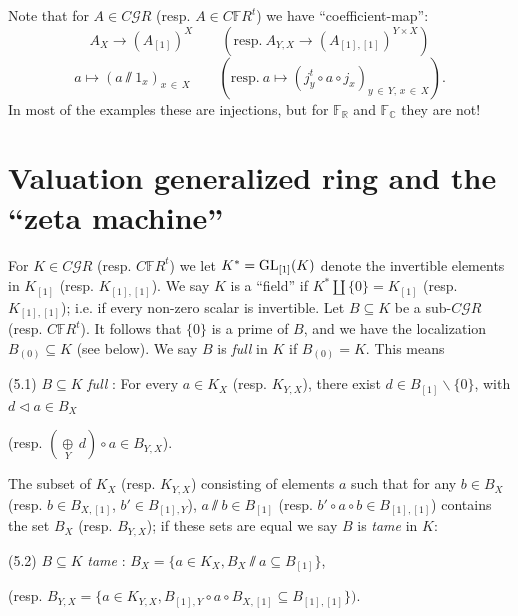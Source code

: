 \documentclass[leqno]{article}
\numberwithin{equation}{section}
\begin{document}
\smallskip

Note that for $A \in C{\mathcal G} R$ (resp. $A \in C{\mathbb F} R^t$) we have ``coefficient-map'':
$$
A_X \to (A_{[1]})^X \qquad (\mbox{resp.} \ A_{Y,X} \to (A_{[1],[1]})^{Y \times X})
$$
$$
a \mapsto (a \sslash 1_x)_{x \, \in \, X} \qquad (\mbox{resp.} \ a \mapsto (j_y^t \circ a \circ j_x)_{y \, \in \, Y , \, x \, \in \, X}).
$$
In most of the examples these are injections, but for ${\mathbb F}_{\mathbb R}$ and ${\mathbb F}_{\mathbb C}$ they are not!


\section{Valuation generalized ring and the ``zeta machine''}

For $K \in C{\mathcal G} R$ (resp. $C{\mathbb F} R^t$) we let $K^* = {\rm GL}_{[1]} (K)$ denote the invertible elements in $K_{[1]}$ (resp. $K_{[1],[1]}$). We say $K$ is a ``field'' if $K^* \amalg \{0\} = K_{[1]}$ (resp. $K_{[1],[1]}$); i.e. if every non-zero scalar is invertible. Let $B \subseteq K$ be a sub-$C{\mathcal G} R$ (resp. $C{\mathbb F} R^t$). It follows that $\{0\}$ is a prime of $B$, and we have the localization $B_{(0)} \subseteq K$ (see below). We say $B$ is {\it full} in $K$ if $B_{(0)} = K$. This means

\bigskip

\noindent (5.1) \quad $B \subseteq K$ {\it full} : For every $a \in K_X$ (resp. $K_{Y,X}$), there exist $d \in B_{[1]} \backslash \{0\}$, with $d \lhd a \in B_X$ 

\qquad (resp. $\left( \underset{Y}{\oplus} \, d \right) \circ a \in B_{Y,X}$).

\bigskip

The subset  of $K_X$ (resp. $K_{Y,X}$) consisting of elements $a$ such that for any $b \in B_X$ (resp. $b \in B_{X,[1]}$, $b' \in B_{[1],Y}$), $a \sslash b \in B_{[1]}$ (resp. $b' \circ a \circ b \in B_{[1],[1]}$) contains the set $B_X$ (resp. $B_{Y,X}$); if these sets are equal we say $B$ is {\it tame} in $K$:

\bigskip

\noindent (5.2) \quad $B \subseteq K$ {\it tame} : $B_X = \{ a \in K_X , B_X \sslash a \subseteq B_{[1]} \}$, 

\smallskip

\qquad  (resp. $B_{Y,X} = \{ a \in K_{Y,X} , B_{[1],Y} \circ a \circ B_{X,[1]} \subseteq B_{[1],[1]} \})$.

\bigskip
\end{document}
